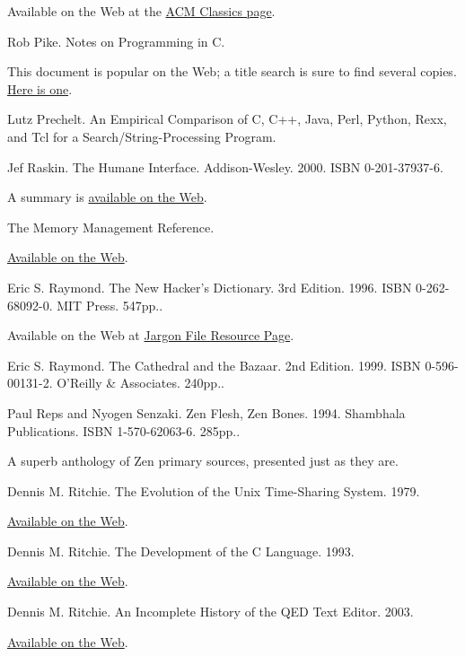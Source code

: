 \documentclass[12pt,oneside]{book}
\begin{document}
\begin{common-format}
\begin{thebibliography}{9}
Available on the Web at the \href{http://www.acm.org/classics/may96/}{ACM Classics page}.

 Rob Pike. Notes on Programming in C.

This document is popular on the Web; a title search is sure to find several copies. \href{http://www.lysator.liu.se/c/pikestyle.html}{Here is one}.

 Lutz Prechelt. An Empirical Comparison of C, C++, Java, Perl, Python, Rexx, and Tcl for a Search/String-Processing Program.

 Jef Raskin. The Humane Interface. Addison-Wesley. 2000. ISBN 0-201-37937-6.

A summary is \href{http://humane.sourceforge.net/humane_interface/summary_of_thi.html}{available on the Web}.

 The Memory Management Reference.

\href{http://www.memorymanagement.org/}{Available on the Web}.

 Eric S. Raymond. The New Hacker's Dictionary. 3rd Edition. 1996. ISBN 0-262-68092-0. MIT Press. 547pp..

Available on the Web at \href{http://www.catb.org/~esr/jargon}{Jargon File Resource Page}.

 Eric S. Raymond. The Cathedral and the Bazaar. 2nd Edition. 1999. ISBN 0-596-00131-2. O'Reilly \&{} Associates. 240pp..

 Paul Reps and Nyogen Senzaki. Zen Flesh, Zen Bones. 1994. Shambhala Publications. ISBN 1-570-62063-6. 285pp..

A superb anthology of Zen primary sources, presented just as they are.

 Dennis M. Ritchie. The Evolution of the Unix Time-Sharing System. 1979.

\href{http://cm.bell-labs.com/cm/cs/who/dmr/hist.html}{Available on the Web}.

 Dennis M. Ritchie. The Development of the C Language. 1993.

\href{http://cm.bell-labs.com/cm/cs/who/dmr/chist.html}{Available on the Web}.

 Dennis M. Ritchie. An Incomplete History of the QED Text Editor. 2003.

\href{http://cm.bell-labs.com/cm/cs/who/dmr/qed.html}{Available on the Web}.


\end{thebibliography}
\end{common-format}
\end{document}
